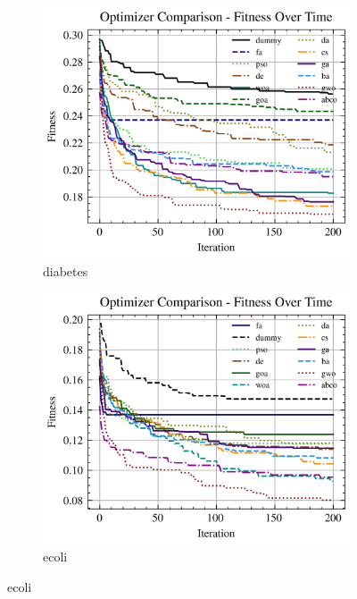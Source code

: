 \begin{figure}[htp]
\begin{subfigure}[htp]{0.45\textwidth}
    \end{subfigure}
    \begin{subfigure}[htp]{0.45\textwidth}
        \includegraphics[width=\textwidth]{imagenes/fitness_charts/img/real/diabetes/optimizers_fitness_knn.png}
        \caption{diabetes}
    \end{subfigure}
    \begin{subfigure}[htp]{0.45\textwidth}
        \includegraphics[width=\textwidth]{imagenes/fitness_charts/img/real/ecoli/optimizers_fitness_knn.png}
        \caption{ecoli}
    \end{subfigure}

\end{figure}
